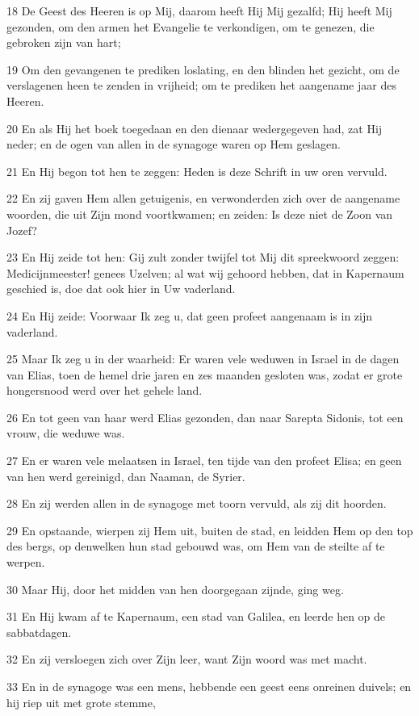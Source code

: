 \par 18 De Geest des Heeren is op Mij, daarom heeft Hij Mij gezalfd; Hij heeft Mij gezonden, om den armen het Evangelie te verkondigen, om te genezen, die gebroken zijn van hart;
\par 19 Om den gevangenen te prediken loslating, en den blinden het gezicht, om de verslagenen heen te zenden in vrijheid; om te prediken het aangename jaar des Heeren.
\par 20 En als Hij het boek toegedaan en den dienaar wedergegeven had, zat Hij neder; en de ogen van allen in de synagoge waren op Hem geslagen.
\par 21 En Hij begon tot hen te zeggen: Heden is deze Schrift in uw oren vervuld.
\par 22 En zij gaven Hem allen getuigenis, en verwonderden zich over de aangename woorden, die uit Zijn mond voortkwamen; en zeiden: Is deze niet de Zoon van Jozef?
\par 23 En Hij zeide tot hen: Gij zult zonder twijfel tot Mij dit spreekwoord zeggen: Medicijnmeester! genees Uzelven; al wat wij gehoord hebben, dat in Kapernaum geschied is, doe dat ook hier in Uw vaderland.
\par 24 En Hij zeide: Voorwaar Ik zeg u, dat geen profeet aangenaam is in zijn vaderland.
\par 25 Maar Ik zeg u in der waarheid: Er waren vele weduwen in Israel in de dagen van Elias, toen de hemel drie jaren en zes maanden gesloten was, zodat er grote hongersnood werd over het gehele land.
\par 26 En tot geen van haar werd Elias gezonden, dan naar Sarepta Sidonis, tot een vrouw, die weduwe was.
\par 27 En er waren vele melaatsen in Israel, ten tijde van den profeet Elisa; en geen van hen werd gereinigd, dan Naaman, de Syrier.
\par 28 En zij werden allen in de synagoge met toorn vervuld, als zij dit hoorden.
\par 29 En opstaande, wierpen zij Hem uit, buiten de stad, en leidden Hem op den top des bergs, op denwelken hun stad gebouwd was, om Hem van de steilte af te werpen.
\par 30 Maar Hij, door het midden van hen doorgegaan zijnde, ging weg.
\par 31 En Hij kwam af te Kapernaum, een stad van Galilea, en leerde hen op de sabbatdagen.
\par 32 En zij versloegen zich over Zijn leer, want Zijn woord was met macht.
\par 33 En in de synagoge was een mens, hebbende een geest eens onreinen duivels; en hij riep uit met grote stemme,
